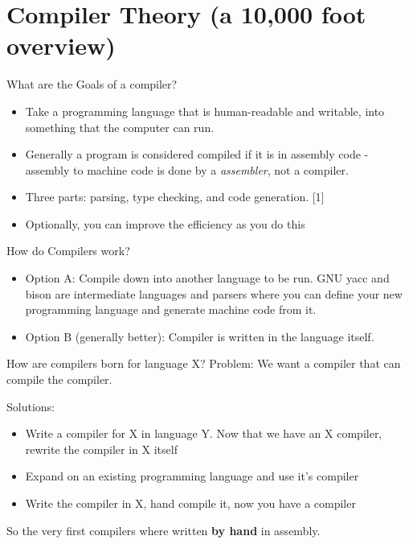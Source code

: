 \documentclass{beamer}
\begin{document}

\section{Compiler Theory (a 10,000 foot overview)}

\begin{frame}{What are the Goals of a compiler?}
  \begin{itemize}
    \item Take a programming language that is human-readable and
      writable, into something that the computer can run.
    \item Generally a program is considered compiled if it is in
      assembly code - assembly to machine code is done by a
      \textit{assembler}, not a compiler.
    \item Three parts: parsing, type checking, and code
      generation. [1]
    \item Optionally, you can improve the efficiency as you do this
  \end{itemize}
\end{frame}

\begin{frame}{How do Compilers work?}
  \begin{itemize}
    \item Option A: Compile down into another
      language to be run. GNU yacc and bison are intermediate
      languages and parsers where you can define your new programming
      language and generate machine code from it.
    \item Option B (generally better): Compiler is written in the
      language itself.
  \end{itemize}
\end{frame}

\begin{frame}{How are compilers born for language X?}
  Problem: We want a compiler that can compile the compiler.

  Solutions:
  \begin{itemize}
    \item Write a compiler for X in language Y. Now that we have an X
      compiler, rewrite the compiler in X itself
    \item Expand on an existing programming language and use it's compiler
    \item Write the compiler in X, hand compile it, now you have a
      compiler
  \end{itemize}
  So the very first compilers where written \textbf{by hand} in
  assembly. 
\end{frame}
\end{document}
